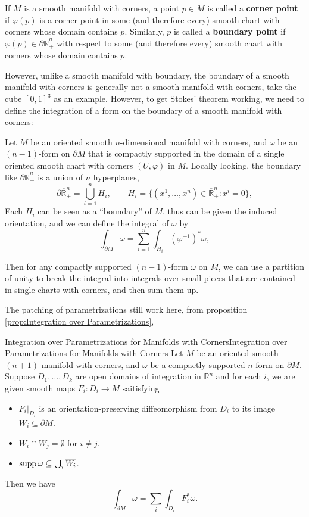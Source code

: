 \documentclass[../main.tex]{subfiles}
\begin{document}
If $M$ is a smooth manifold with corners, a point $p\in M$ is called a \textbf{corner point} if $\varphi(p)$ is a corner point in some (and therefore every) smooth chart with corners whose domain contains $p$. Similarly, $p$ is called a \textbf{boundary point} if $\varphi(p) \in \partial \overline{\mathbb{R}}_+^n$ with respect to some (and therefore every) smooth chart with corners whose domain contains $p$.

However, unlike a smooth manifold with boundary, the boundary of a smooth manifold with corners is generally not a smooth manifold with corners, take the cube $[0,1]^3$ as an example. However, to get Stokes' theorem working, we need to define the integration of a form on the boundary of a smooth manifold with corners:

Let $M$ be an oriented smooth $n$-dimensional manifold with corners, and $\omega$ be an $(n-1)$-form on $\partial M$ that is compactly supported in the domain of a single oriented smooth chart with corners $(U,\varphi)$ in $M$. Locally looking, the boundary like $\partial \overline{\mathbb{R}}_+^n$ is a union of $n$ hyperplanes,
\begin{equation*}
  \partial \overline{\mathbb{R}}_+^n = \bigcup_{i=1}^n H_i, \qquad H_i = \{(x^1, \ldots , x^n) \in \overline{\mathbb{R}}_+^n : x^i = 0\},
\end{equation*}
Each $H_i$ can be seen as a ``boundary'' of $M$, thus can be given the induced orientation, and we can define the integral of $\omega$ by
\begin{equation}
  \int_{\partial M} \omega = \sum_{i=1}^n \int_{H_i} (\varphi^{-1})^* \omega,
\end{equation}

Then for any compactly supported $(n-1)$-form $\omega$ on $M$, we can use a partition of unity to break the integral into integrals over small pieces that are contained in single charts with corners, and then sum them up.

The patching of parametrizations still work here, from proposition \ref{prop:Integration over Parametrizations},
\begin{proposition}{Integration over Parametrizations for Manifolds with Corners}{Integration over Parametrizations for Manifolds with Corners}
  Let $M$ be an oriented smooth $(n+1)$-manifold with corners, and $\omega$ be a compactly supported $n$-form on $\partial M$. Suppose $D_1, \ldots ,D_k$ are open domains of integration in $\mathbb{R}^n$ and for each $i$, we are given smooth maps $F_i: \overline{D_i} \to M$ saitisfying
  \begin{itemize}
    \item $F_i|_{D_i}$ is an orientation-preserving diffeomorphism from $D_i$ to its image $W_i \subseteq \partial M$.
    \item $W_i \cap W_j = \emptyset$ for $i\neq j$.
    \item $\operatorname{supp} \omega \subseteq \bigcup_i \overline{W_i}$.
  \end{itemize}
  Then we have
  \begin{equation}
    \int_{\partial M} \omega = \sum_i \int_{D_i} F_i^*\omega.
  \end{equation}
\end{proposition}
\end{document}
